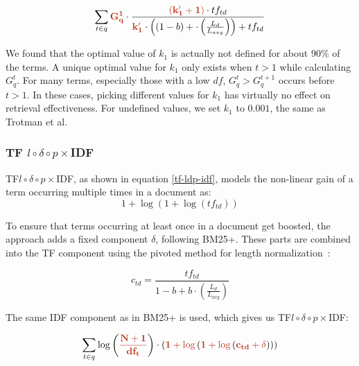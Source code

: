 \begin{equation}
	\label{bm25-adpt}
	\sum_{t\in q}\mathbf{\begingroup\color{ruhuisstijlrood}G_q^1\endgroup}\cdot\frac{\mathbf{\begingroup\color{ruhuisstijlrood}\left(k'_1+1\right)\endgroup}\cdot tf_{td}}{\mathbf{\begingroup\color{ruhuisstijlrood}k'_1\endgroup}\cdot\left(\left(1-b\right)+\cdot\left(\frac{L_d}{L_{avg}}\right)\right)+tf_{td}}
\end{equation}

We found that the optimal value of $k_1$ is actually not defined for about 90\% of the terms. A unique optimal value for $k_1$ only exists when $t > 1$ while calculating $G^t_q$. For many terms, especially those with a low $df$, $G^t_q > G^{t+1}_q$ occurs before $t > 1$. In these cases, picking different values for $k_1$ has virtually no effect on retrieval effectiveness. For undefined values, we set $k_1$ to $0.001$, the same as Trotman et al.~\cite{trotman-bm25}


\subsubsection{TF $l\circ\delta\circ p\times$IDF~\cite{tf-ldp-idf}}
TF$l\circ\delta\circ p\times$IDF, as shown in equation \ref{tf-ldp-idf}, models the non-linear gain of a term occurring multiple times in a document as:
\begin{equation}
	1+\log\left(1+\log\left(tf_{td}\right)\right) 
\end{equation}

To ensure that terms occurring at least once in a document get boosted, the approach adds a fixed component $\delta$, following BM25+. These parts are combined into the TF component using the pivoted method for length normalization~\cite{ctd}:

\begin{equation}
	c_{td} = \frac{tf_{td}}{1-b+b\cdot\left(\frac{L_d}{L_{avg}}\right)}
\end{equation}

The same IDF component as in BM25+ is used, which gives us TF$l\circ\delta\circ p\times$IDF: 

\begin{equation}
	\label{tf-ldp-idf}
	\sum_{t\in q}\log\left(\mathbf{\begingroup\color{ruhuisstijlrood}\frac{N+1}{df_t}\endgroup}\right)\cdot\left(\mathbf{\begingroup\color{ruhuisstijlrood}1+\log\endgroup}\left(\mathbf{\begingroup\color{ruhuisstijlrood}1+\log\endgroup}\left(\mathbf{\begingroup\color{ruhuisstijlrood}c_{td}+\delta\endgroup}\right)\right)\right)
\end{equation}

